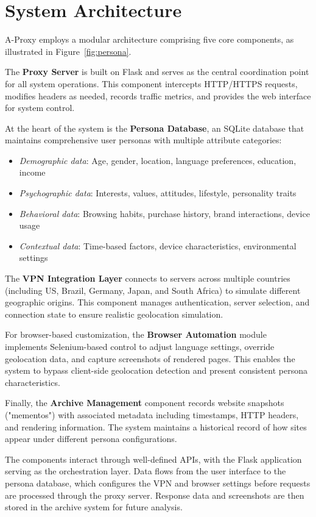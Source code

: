 \documentclass[sigconf]{acmart}
\begin{document}
\section{System Architecture}
A-Proxy employs a modular architecture comprising five core components, as illustrated in Figure~\ref{fig:persona}.

The \textbf{Proxy Server} is built on Flask and serves as the central coordination point for all system operations. This component intercepts HTTP/HTTPS requests, modifies headers as needed, records traffic metrics, and provides the web interface for system control.

At the heart of the system is the \textbf{Persona Database}, an SQLite database that maintains comprehensive user personas with multiple attribute categories:
\begin{itemize}
    \item \textit{Demographic data}: Age, gender, location, language preferences, education, income
    \item \textit{Psychographic data}: Interests, values, attitudes, lifestyle, personality traits
    \item \textit{Behavioral data}: Browsing habits, purchase history, brand interactions, device usage
    \item \textit{Contextual data}: Time-based factors, device characteristics, environmental settings
\end{itemize}

The \textbf{VPN Integration Layer} connects to servers across multiple countries (including US, Brazil, Germany, Japan, and South Africa) to simulate different geographic origins. This component manages authentication, server selection, and connection state to ensure realistic geolocation simulation.

For browser-based customization, the \textbf{Browser Automation} module implements Selenium-based control to adjust language settings, override geolocation data, and capture screenshots of rendered pages. This enables the system to bypass client-side geolocation detection and present consistent persona characteristics.

Finally, the \textbf{Archive Management} component records website snapshots ("mementos") with associated metadata including timestamps, HTTP headers, and rendering information. The system maintains a historical record of how sites appear under different persona configurations.

The components interact through well-defined APIs, with the Flask application serving as the orchestration layer. Data flows from the user interface to the persona database, which configures the VPN and browser settings before requests are processed through the proxy server. Response data and screenshots are then stored in the archive system for future analysis.
\end{document}
